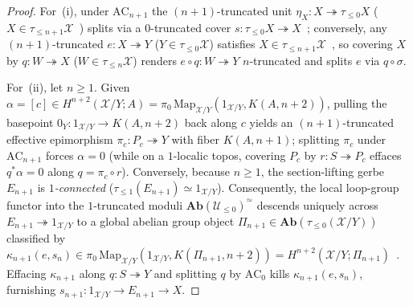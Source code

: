 \begin{proof}
For~(i), under $\mathrm{AC}_{n+1}$ the $(n+1)$-truncated unit $\eta_X : X \twoheadrightarrow \tau_{\le 0}X$ ($X \in \tau_{\le n+1}\mathcal{X}$~\cite[Lemma~5.5.6.15]{Lurie09}) splits via a $0$-truncated cover $s : \tau_{\le 0}X \twoheadrightarrow X$~\cite[Prop.~7.2.1.14]{Lurie09}; conversely, any $(n+1)$-truncated $e : X \twoheadrightarrow Y$ ($Y \in \tau_{\le 0}\mathcal{X}$) satisfies $X \in \tau_{\le n+1}\mathcal{X}$~\cite[Lemma~5.5.6.14]{Lurie09}, so covering $X$ by $q : W \twoheadrightarrow X$ ($W \in \tau_{\le n}\mathcal{X}$) renders $e \circ q : W \twoheadrightarrow Y$ $n$-truncated and splits $e$ via $q \circ \sigma$.

For~(ii), let $n \ge 1$. Given $\alpha = [c] \in H^{n+2}(\mathcal{X}/Y; A) = \pi_0\,\mathrm{Map}_{\mathcal{X}/Y}(1_{\mathcal{X}/Y}, K(A, n+2))$, pulling the basepoint $0_Y : 1_{\mathcal{X}/Y} \to K(A, n+2)$ back along $c$ yields an $(n+1)$-truncated effective epimorphism $\pi_c : P_c \twoheadrightarrow Y$ with fiber $K(A, n+1)$; splitting $\pi_c$ under $\mathrm{AC}_{n+1}$ forces $\alpha = 0$ (while on a $1$-localic topos, covering $P_c$ by $r : S \twoheadrightarrow P_c$ effaces $q^*\alpha = 0$ along $q = \pi_c \circ r$). Conversely, because $n \ge 1$, the section-lifting gerbe $E_{n+1}$ is \emph{$1$-connected} ($\tau_{\le 1}(E_{n+1}) \simeq 1_{\mathcal{X}/Y}$). Consequently, the local loop-group functor into the $1$-truncated moduli $\mathbf{Ab}(\mathcal{U}_{\le 0})^\simeq$ descends uniquely across $E_{n+1} \twoheadrightarrow 1_{\mathcal{X}/Y}$ to a global abelian group object $\Pi_{n+1} \in \mathbf{Ab}(\tau_{\le 0}(\mathcal{X}/Y))$ classified by $\kappa_{n+1}(e, s_n) \in \pi_0\,\mathrm{Map}_{\mathcal{X}/Y}(1_{\mathcal{X}/Y}, K(\Pi_{n+1}, n+2)) = H^{n+2}(\mathcal{X}/Y; \Pi_{n+1})$~\cite[Constr.~7.2.2.21, Thm.~7.2.2.26]{Lurie09}. Effacing $\kappa_{n+1}$ along $q : S \twoheadrightarrow Y$ and splitting $q$ by $\mathrm{AC}_0$ kills $\kappa_{n+1}(e, s_n)$, furnishing $s_{n+1} : 1_{\mathcal{X}/Y} \to E_{n+1} \to X$.


\end{proof}
